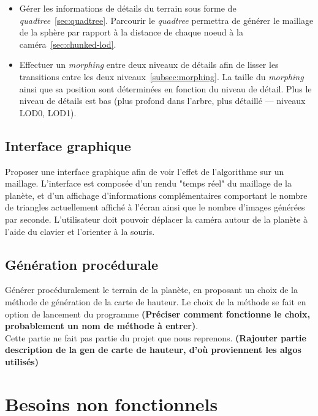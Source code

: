 \begin{itemize}
\item
  Gérer les informations de détails du terrain sous forme de
    \emph{quadtree}~\ref{sec:quadtree}. Parcourir le \emph{quadtree} permettra de
    générer le maillage de la sphère par rapport à la distance de chaque
    noeud à la caméra~\ref{sec:chunked-lod}.
\item
  Effectuer un \emph{morphing} entre deux niveaux de détails afin de
    lisser les transitions entre les deux niveaux~\ref{subsec:morphing}. La
    taille du \emph{morphing} ainsi que sa position sont déterminées en
    fonction du niveau de détail. Plus le niveau de détails est bas
    (plus profond dans l'arbre, plus détaillé --- niveaux LOD0, LOD1).
\end{itemize}

\subsection{Interface graphique}\label{interface-graphique}

Proposer une interface graphique afin de voir l'effet de l'algorithme
sur un maillage. L'interface est composée d'un rendu "temps réel" du
maillage de la planète, et d'un affichage d'informations complémentaires
comportant le nombre de triangles actuellement affiché à l'écran ainsi
que le nombre d'images générées par seconde. L'utilisateur doit pouvoir
déplacer la caméra autour de la planète à l'aide du clavier et
l'orienter à la souris.\\

\subsection{Génération procédurale}\label{generation-procedurale}

Générer procéduralement le terrain de la planète, en proposant un choix
de la méthode de génération de la carte de hauteur. Le choix de la
méthode se fait en option de lancement du programme \textbf{(Préciser
comment fonctionne le choix, probablement un nom de méthode à
entrer)}.\\
Cette partie ne fait pas partie du projet que nous reprenons.
\textbf{(Rajouter partie description de la gen de carte de hauteur, d'où
proviennent les algos utilisés)}

\section{Besoins non fonctionnels}\label{besoins-non-fonctionnels}


